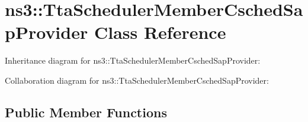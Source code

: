 \hypertarget{classns3_1_1TtaSchedulerMemberCschedSapProvider}{}\section{ns3\+:\+:Tta\+Scheduler\+Member\+Csched\+Sap\+Provider Class Reference}
\label{classns3_1_1TtaSchedulerMemberCschedSapProvider}


Inheritance diagram for ns3\+:\+:Tta\+Scheduler\+Member\+Csched\+Sap\+Provider\+:


Collaboration diagram for ns3\+:\+:Tta\+Scheduler\+Member\+Csched\+Sap\+Provider\+:
\subsection*{Public Member Functions}
